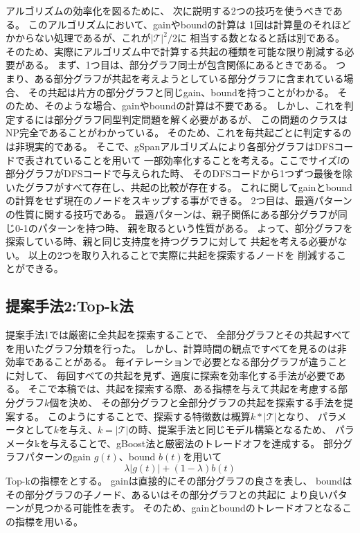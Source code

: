 アルゴリズムの効率化を図るために、
次に説明する2つの技巧を使うべきである。
このアルゴリズムにおいて、gainやboundの計算は
1回は計算量のそれほどかからない処理であるが、これが$|\mathcal{T}|^2/2$に
相当する数となると話は別である。
そのため、実際にアルゴリズム中で計算する共起の種類を可能な限り削減する必要がある。
まず、1つ目は、部分グラフ同士が包含関係にあるときである。
つまり、ある部分グラフが共起を考えようとしている部分グラフに含まれている場合、
その共起は片方の部分グラフと同じgain、boundを持つことがわかる。
そのため、そのような場合、gainやboundの計算は不要である。
しかし、これを判定するには部分グラフ同型判定問題を解く必要があるが、
この問題のクラスはNP完全であることがわかっている。
そのため、これを毎共起ごとに判定するのは非現実的である。
そこで、gSpanアルゴリズムにより各部分グラフはDFSコードで表されていることを用いて
一部効率化することを考える。ここでサイズ$l$の部分グラフがDFSコードで与えられた時、
そのDFSコードから1つずつ最後を除いたグラフがすべて存在し、共起の比較が存在する。
これに関してgainとboundの計算をせず現在のノードをスキップする事ができる。
2つ目は、最適パターンの性質に関する技巧である。
最適パターンは、親子関係にある部分グラフが同じ0-1のパターンを持つ時、
親を取るという性質がある。
よって、部分グラフを探索している時、親と同じ支持度を持つグラフに対して
共起を考える必要がない。
以上の2つを取り入れることで実際に共起を探索するノードを
削減することができる。



\subsection{提案手法2:Top-k法}
\label{tk}

提案手法1では厳密に全共起を探索することで、
全部分グラフとその共起すべてを用いたグラフ分類を行った。
しかし、計算時間の観点ですべてを見るのは非効率であることがある。
毎イテレーションで必要となる部分グラフが違うことに対して、
毎回すべての共起を見ず、適度に探索を効率化する手法が必要である。
そこで本稿では、共起を探索する際、ある指標を与えて共起を考慮する部分グラフ$k$個を決め、
その部分グラフと全部分グラフの共起を探索する手法を提案する。
このようにすることで、探索する特徴数は概算$k*|\mathcal{T}|$となり、
パラメータとして$k$を与え、$k=|\mathcal{T}|$の時、提案手法と同じモデル構築となるため、
パラメータkを与えることで、gBoost法と厳密法のトレードオフを達成する。
部分グラフパターンのgain $g(t)$、bound $b(t)$を用いて
\begin{equation}
  \lambda |g(t)| + (1 - \lambda) b(t) \label{lam}
\end{equation}
Top-kの指標をとする。
gainは直接的にその部分グラフの良さを表し、
boundはその部分グラフの子ノード、あるいはその部分グラフとの共起に
より良いパターンが見つかる可能性を表す。
そのため、gainとboundのトレードオフとなるこの指標を用いる。


